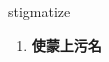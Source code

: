 
\begin{frame}
{\huge stigmatize}
\begin{center}
\begin{enumerate}\Large
  \item \textbf{使蒙上污名}
\end{enumerate}
\end{center}
\end{frame}
